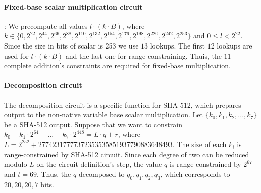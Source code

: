 \paragraph{Fixed-base scalar multiplication circuit}:
We precompute all values $l \cdot (k \cdot B)$, where $k \in \{0, 2^{22}, 2^{44}, 2^{66}, 2^{88}, 2^{110},
 2^{132}, 2^{154}, 2^{176}, 2^{198}, 2^{220}, 2^{242}, 2^{253} \}$ and $0 \leq l < 2^22$.
Since the size in bits of scalar is 253 we use $13$ lookups.
The first $12$ lookups are used for $l \cdot (k \cdot B)$ and the last one for range constraining.
Thuis, the $11$ complete addition's constraints are required for fixed-base multiplication. 


\paragraph{Decomposition circuit}
The decomposition circuit is a specific function for SHA-512, which prepares output to the non-native variable base scalar multiplication.
Let $\{ k_0, k_1, k_2, ..., k_7\}$ be a SHA-512 output.
Suppose that we want to constrain $k_0 + k_1 \cdot 2^{64} + ...+ k_7 \cdot 2^{448} = L \cdot q + r$, where $L = 2^{252}+27742317777372353535851937790883648493$.
The size of each $k_i$ is range-constrained by SHA-512 circuit.
Since each degree of two can be reduced modulo $L$ on the circuit definition's step, the value $q$ is range-constrained by $2^67$ and $t = 69$.
Thus, the $q$ decomposed to $q_0, q_1, q_2, q_3$, which corresponds to $20, 20, 20, 7$ bits.
